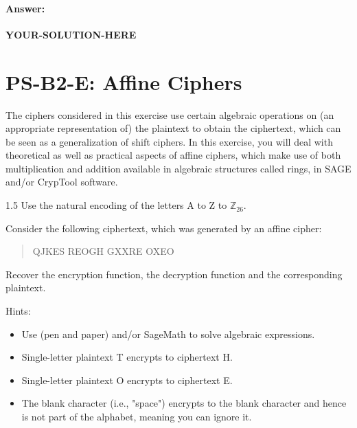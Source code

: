 \documentclass[]{scrartcl}
\newcommand{\ZZ}{\mathbb{Z}}
\newcounter{exercise}
\newcounter{qid}[section]
\newcommand{\exerciseprefix}{prefix}
\newcommand{\questiontitle}{Questions}
\newcommand{\blockid}{B2}
\newcommand{\exname}{}
\newcommand{\yoursolutionhere}{\textbf{YOUR-SOLUTION-HERE}}
\begin{document}
\paragraph{Answer:} \yoursolutionhere{}



\pagebreak
{}
\renewcommand{\exname}{Affine Ciphers}
\section*{PS-\blockid{}-E\theexercise: Affine Ciphers}
The ciphers considered in this exercise use certain algebraic operations on (an appropriate representation of) the plaintext to obtain the ciphertext, which can be seen as a generalization of shift ciphers. In this exercise, you will deal with theoretical as well as practical aspects of affine ciphers, which make use of both multiplication and addition available in algebraic structures called rings, in SAGE and/or CrypTool software. 




\renewcommand{\exerciseprefix}{PS-\blockid{}-E\theexercise: \exname-Q\theqid}
\renewcommand{\questiontitle}{\exerciseprefix{}: Algebraic attack}
\begin{exercisebox}{1.5}
Use the natural encoding of the letters A to Z to $\ZZ_{26}$. \newline

Consider the following ciphertext, which was generated by an affine cipher:
\begin{quote}
    QJKES REOGH GXXRE OXEO
\end{quote}
Recover the encryption function, the decryption function and the corresponding plaintext. 

{\small Hints:
\begin{itemize}
    \item Use (pen and paper) and/or SageMath to solve algebraic expressions. 
    \item Single-letter plaintext T encrypts to ciphertext H. 
    \item Single-letter plaintext O encrypts to ciphertext E. 
    \item The blank character (i.e., "space") encrypts to the blank character and hence is not part of the alphabet, meaning you can ignore it. 
\end{itemize}}
\end{exercisebox}
\end{document}
